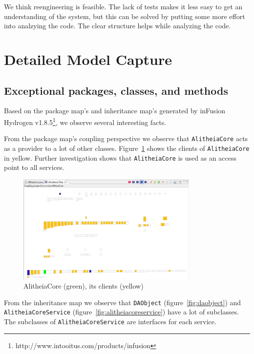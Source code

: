 \documentclass{article}
\begin{document}
We think reengineering is feasible. The lack of tests makes it less easy to get an understanding of the system, but this can be solved by putting some more effort into analzying the code. The clear structure helps while analyzing the code.

\section{Detailed Model Capture}

\subsection{Exceptional packages, classes, and methods}
Based on the package map's and inheritance map's generated by inFusion Hydrogen v1.8.5\footnote{http://www.intooitus.com/products/infusion}, we observe several interesting facts.

From the package map's coupling perspective we observe that \verb|AlitheiaCore| acts as a provider to a lot of other classes. Figure~\ref{fig:alitheiacore} shows the clients of \verb|AlitheiaCore| in yellow. Further investigation shows that \verb|AlitheiaCore| is used as an access point to all services.

\begin{figure}[h]
    \centering
    \includegraphics[width=0.8\textwidth]{alitheiacore-coupling}
    \caption{AlitheiaCore (green), its clients (yellow)}
    \label{fig:alitheiacore}
\end{figure}

From the inheritance map we observe that \verb|DAObject| (figure~\ref{fig:daobject}) and \verb|AlitheiaCoreService| (figure~\ref{fig:alitheiacoreservice}) have a lot of subclasses. The subclasses of \verb|AlitheiaCoreService| are interfaces for each service.
\end{document}
